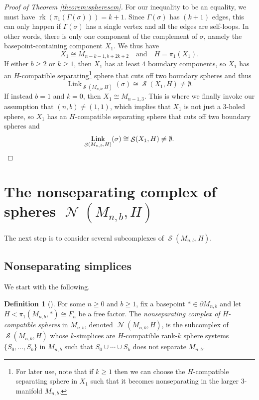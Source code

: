\documentclass[11pt]{amsart}
\numberwithin{equation}{section}
\theoremstyle{plain}
\theoremstyle{definition}
\newtheorem{defn}[theorem]{Definition}
\newenvironment{definition}[1][]{\begin{defn}[#1]\pushQED{\qed}}{\popQED \end{defn}}
\theoremstyle{remark}
\DeclareMathOperator{\rank}{rk}
\DeclareMathOperator{\Spheres}{\mathcal{S}}
\DeclareMathOperator{\NSpheres}{\mathcal{N}}
\DeclareMathOperator{\Link}{Link}
\begin{document}
\begin{proof}[Proof of Theorem \ref{theorem:spherescm}]
For our inequality to be an equality, we must have $\rank(\pi_1(\Gamma(\sigma))) = k+1$.  Since
$\Gamma(\sigma)$ has $(k+1)$ edges, this can only happen if $\Gamma(\sigma)$ has a single
vertex and all the edges are self-loops.  In other words, there is only one component
of the complement of $\sigma$, namely the basepoint-containing component $X_1$.  We thus
have
\[X_1 \cong M_{n-k-1,b+2k+2} \quad \text{and} \quad H = \pi_1(X_1).\]
If either $b \geq 2$ or $k \geq 1$, then $X_1$ has at least $4$ boundary components, so $X_1$ has an $H$-compatible
separating\footnote{For later use, note that if $k \geq 1$ then we can choose the $H$-compatible separating sphere in $X_1$
such that it becomes nonseparating in the larger $3$-manifold $M_{n,b}$.} sphere that cuts off two boundary spheres and thus
\[\Link_{\Spheres(M_{n,b},H)}(\sigma) \cong \Spheres(X_1,H) \neq \emptyset.\]
If instead $b = 1$ and $k = 0$, then $X_1 \cong M_{n-1,3}$.  This
is where we finally invoke our assumption that $(n,b) \neq (1,1)$, which implies that
$X_1$ is not just a $3$-holed sphere, so $X_1$ has an $H$-compatible
separating sphere that cuts off two boundary spheres and
\[\Link_{\Spheres(M_{n,b},H)}(\sigma) \cong \Spheres(X_1,H) \neq \emptyset.\qedhere\]
\end{proof}

\section{The nonseparating complex of spheres \texorpdfstring{$\NSpheres(M_{n,b},H)$}{N(M,H)}}
\label{section:nsspheres}

The next step is to consider several subcomplexes of $\Spheres(M_{n,b},H)$.

\subsection{Nonseparating simplices}
We start with the following.

\begin{definition}
For some $n \geq 0$ and $b \geq 1$, fix a basepoint $\ast \in \partial M_{n,b}$
and let $H < \pi_1(M_{n,b},\ast) \cong F_n$ be a free factor.  The {\em nonseparating complex of
$H$-compatible spheres} in $M_{n,b}$, denoted $\NSpheres(M_{n,b},H)$, is
the subcomplex of $\Spheres(M_{n,b},H)$ whose $k$-simplices are $H$-compatible rank-$k$ sphere
systems $\{S_0,\ldots,S_k\}$ in $M_{n,b}$ such that $S_0 \cup \cdots \cup S_k$ does not
separate $M_{n,b}$.
\end{definition}
\end{document}

